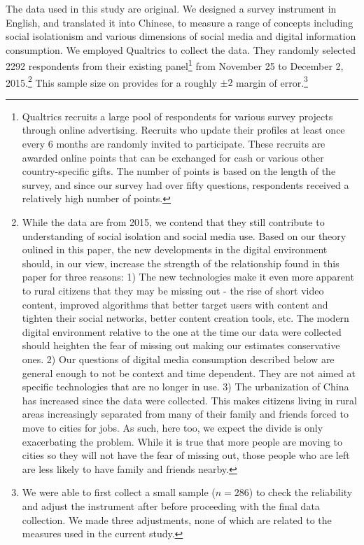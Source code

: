 \documentclass[]{interact}
\theoremstyle{plain}%
\theoremstyle{definition}
\theoremstyle{remark}
\begin{document}
The data used in this study are original. We designed a survey
instrument in English, and translated it into Chinese, to measure a
range of concepts including social isolationism and various dimensions
of social media and digital information consumption. We employed
Qualtrics to collect the data. They randomly selected 2292 respondents
from their existing panel\footnote{Qualtrics recruits a large pool of
  respondents for various survey projects through online advertising.
  Recruits who update their profiles at least once every 6 months are
  randomly invited to participate. These recruits are awarded online
  points that can be exchanged for cash or various other
  country-specific gifts. The number of points is based on the length of
  the survey, and since our survey had over fifty questions, respondents
  received a relatively high number of points.} from November 25 to
December 2, 2015.\footnote{While the data are from 2015, we contend that
  they still contribute to understanding of social isolation and social
  media use. Based on our theory oulined in this paper, the new
  developments in the digital environment should, in our view, increase
  the strength of the relationship found in this paper for three
  reasons: 1) The new technologies make it even more apparent to rural
  citizens that they may be missing out - the rise of short video
  content, improved algorithms that better target users with content and
  tighten their social networks, better content creation tools, etc. The
  modern digital environment relative to the one at the time our data
  were collected should heighten the fear of missing out making our
  estimates conservative ones. 2) Our questions of digital media
  consumption described below are general enough to not be context and
  time dependent. They are not aimed at specific technologies that are
  no longer in use. 3) The urbanization of China has increased since the
  data were collected. This makes citizens living in rural areas
  increasingly separated from many of their family and friends forced to
  move to cities for jobs. As such, here too, we expect the divide is
  only exacerbating the problem. While it is true that more people are
  moving to cities so they will not have the fear of missing out, those
  people who are left are less likely to have family and friends nearby.}
This sample size on provides for a roughly \(\pm2\) margin of
error.\footnote{We were able to first collect a small sample (\(n=286\))
  to check the reliability and adjust the instrument after before
  proceeding with the final data collection. We made three adjustments,
  none of which are related to the measures used in the current study.}
\end{document}
